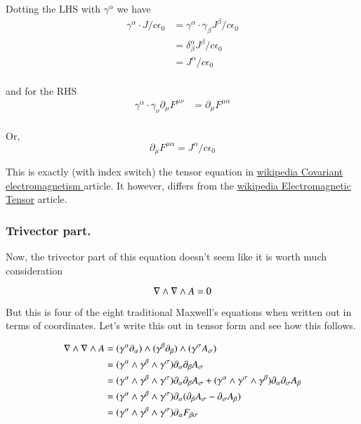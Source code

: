 Dotting the LHS with $\gamma^{\alpha}$ we have
\begin{align*}
\gamma^{\alpha} \cdot J/c \epsilon_0 
&= \gamma^{\alpha} \cdot \gamma_{\beta }J^{\beta}/c \epsilon_0 \\
&= \delta^{\alpha}_{\beta }J^{\beta}/c \epsilon_0 \\
&= J^{\alpha}/c \epsilon_0 \\
\end{align*}

and for the RHS 
\begin{align*}
\gamma^{\alpha} \cdot \gamma_{\nu} \partial_{\mu} F^{\mu\nu}
&= \partial_{\mu} F^{\mu\alpha} \\
\end{align*}

Or,
\begin{equation}
\partial_{\mu} F^{\mu\alpha} = J^{\alpha}/c \epsilon_0
\end{equation}

This is exactly (with index switch) the tensor equation in 
\href{http://en.wikipedia.org/wiki/Covariant\_formulation\_of\_classical\_electromagnetism}{ wikipedia Covariant electromagnetism } article.
It however, differs from the 
\href{http://en.wikipedia.org/wiki/Electromagnetic_tensor}{wikipedia Electromagnetic Tensor} article.

\subsubsection{Trivector part. }

Now, the trivector part of this equation doesn't seem like it is worth much consideration

\begin{equation}
\nabla \wedge \nabla \wedge A = 0
\end{equation}

But this is four of the eight traditional Maxwell's equations when written out in terms of coordinates.  Let's write this out in tensor form
and see how this follows.

\begin{align*}
\nabla \wedge \nabla \wedge A 
&= (\gamma^{\alpha} \partial_{\alpha}) \wedge (\gamma^{\beta} \partial_{\beta}) \wedge (\gamma^{\sigma} A_{\sigma}) \\
&= (\gamma^{\alpha} \wedge \gamma^{\beta} \wedge \gamma^{\sigma}) \partial_{\alpha} \partial_{\beta} A_{\sigma} \\
&= 
(\gamma^{\alpha} \wedge \gamma^{\beta} \wedge \gamma^{\sigma}) \partial_{\alpha} \partial_{\beta} A_{\sigma} 
+
(\gamma^{\alpha} \wedge \gamma^{\sigma} \wedge \gamma^{\beta}) \partial_{\alpha} \partial_{\sigma} A_{\beta} 
\\
&= (\gamma^{\alpha} \wedge \gamma^{\beta} \wedge \gamma^{\sigma}) \partial_{\alpha} (\partial_{\beta} A_{\sigma} - \partial_{\sigma} A_{\beta}) \\
&= (\gamma^{\alpha} \wedge \gamma^{\beta} \wedge \gamma^{\sigma}) \partial_{\alpha} F_{\beta\sigma} \\
\end{align*}

